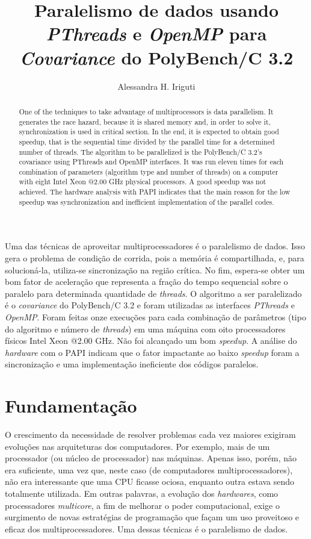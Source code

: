 \documentclass[12pt]{article}
\title{Paralelismo de dados usando \textit{PThreads} e \textit{OpenMP} para \textit{Covariance} do PolyBench/C 3.2}
\author{Alessandra H. Iriguti\inst{1}}
\begin{document}
 

\maketitle

\begin{abstract}
One of the techniques to take advantage of multiprocessors is data parallelism. It generates the race hazard, because it is shared memory and, in order to solve it, synchronization is used in critical section. In the end, it is expected to obtain good speedup, that is the sequential time divided by the parallel time for a determined number of threads. The algorithm to be parallelized is the PolyBench/C 3.2's covariance using PThreads and OpenMP interfaces. It was run eleven times for each combination of parameters (algorithm type and number of threads) on a computer with eight Intel Xeon @2.00 GHz physical processors. A good speedup was not achieved. The hardware analysis with PAPI indicates that the main reason for the low speedup was synchronization and inefficient implementation of the parallel codes.
\end{abstract}
     
\begin{resumo} 
Uma das técnicas de aproveitar multiprocessadores é o paralelismo de dados. Isso gera o problema de condição de corrida, pois a memória é compartilhada, e, para solucioná-la, utiliza-se sincronização na região crítica. No fim, espera-se obter um bom fator de aceleração que representa a fração do tempo sequencial sobre o paralelo para determinada quantidade de \textit{threads}. O algoritmo a ser paralelizado é o \textit{covariance} do PolyBench/C 3.2 e foram utilizadas as interfaces \textit{PThreads} e \textit{OpenMP}. Foram feitas onze execuções para cada combinação de parâmetros (tipo do algoritmo e número de \textit{threads}) em uma máquina com oito processadores físicos Intel Xeon @2.00 GHz. Não foi alcançado um bom \textit{speedup}. A análise do \textit{hardware} com o PAPI indicam que o fator impactante ao baixo \textit{speedup} foram a sincronização e uma implementação ineficiente dos códigos paralelos.
\end{resumo}


\section{Fundamentação}

O crescimento da necessidade de resolver problemas cada vez maiores exigiram evoluções nas arquiteturas dos computadores. Por exemplo, mais de um processador (ou núcleo de processador) nas máquinas. Apenas isso, porém, não era suficiente, uma vez que, neste caso (de computadores multiprocessadores), não era interessante que uma CPU ficasse ociosa, enquanto outra estava sendo totalmente utilizada. Em outras palavras, a evolução dos \textit{hardwares}, como processadores \textit{multicore}, a fim de melhorar o poder computacional, exige o surgimento de novas estratégias de programação que façam um uso proveitoso e eficaz dos multiprocessadores. Uma dessas técnicas é o paralelismo de dados.
\end{document}

